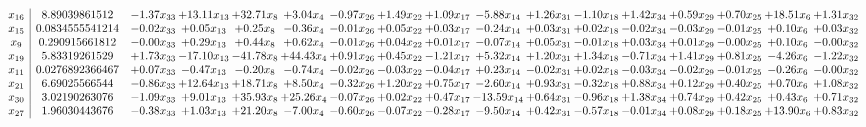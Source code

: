 \documentclass[9pt]{article}
\begin{document}
 \[\begin{array}{c| c c@{\hskip 2pt} c@{\hskip 2pt} c@{\hskip 2pt} c@{\hskip 2pt} c@{\hskip 2pt} c@{\hskip 2pt} c@{\hskip 2pt} c@{\hskip 2pt} c@{\hskip 2pt} c@{\hskip 2pt} c@{\hskip 2pt} c@{\hskip 2pt} c@{\hskip 2pt} c@{\hskip 2pt} c@{\hskip 2pt} }
 x_{16}   &  8.89039861512 & -1.37 x_{33} & + 13.11 x_{13} & + 32.71 x_{8} & +  3.04 x_{4} & -0.97 x_{26} & +  1.49 x_{22} & +  1.09 x_{17} & -5.88 x_{14} & +  1.26 x_{31} & -1.10 x_{18} & +  1.42 x_{34} & +  0.59 x_{29} & +  0.70 x_{25} & + 18.51 x_{6} & +  1.31 x_{32}\\
 x_{15}   &  0.0834555541214 & -0.02 x_{33} & +  0.05 x_{13} & +  0.25 x_{8} & -0.36 x_{4} & -0.01 x_{26} & +  0.05 x_{22} & +  0.03 x_{17} & -0.24 x_{14} & +  0.03 x_{31} & +  0.02 x_{18} & -0.02 x_{34} & -0.03 x_{29} & -0.01 x_{25} & +  0.10 x_{6} & +  0.03 x_{32}\\
 x_{9}   &  0.290915661812 & -0.00 x_{33} & +  0.29 x_{13} & +  0.44 x_{8} & +  0.62 x_{4} & -0.01 x_{26} & +  0.04 x_{22} & +  0.01 x_{17} & -0.07 x_{14} & +  0.05 x_{31} & -0.01 x_{18} & +  0.03 x_{34} & +  0.01 x_{29} & -0.00 x_{25} & +  0.10 x_{6} & -0.00 x_{32}\\
 x_{19}   &  5.83319261529 & +  1.73 x_{33} & -17.10 x_{13} & -41.78 x_{8} & + 44.43 x_{4} & +  0.91 x_{26} & +  0.45 x_{22} & -1.21 x_{17} & +  5.32 x_{14} & +  1.20 x_{31} & +  1.34 x_{18} & -0.71 x_{34} & +  1.41 x_{29} & +  0.81 x_{25} & -4.26 x_{6} & -1.22 x_{32}\\
 x_{11}   &  0.0276892366467 & +  0.07 x_{33} & -0.47 x_{13} & -0.20 x_{8} & -0.74 x_{4} & -0.02 x_{26} & -0.03 x_{22} & -0.04 x_{17} & +  0.23 x_{14} & -0.02 x_{31} & +  0.02 x_{18} & -0.03 x_{34} & -0.02 x_{29} & -0.01 x_{25} & -0.26 x_{6} & -0.00 x_{32}\\
 x_{21}   &  6.69025566544 & -0.86 x_{33} & + 12.64 x_{13} & + 18.71 x_{8} & +  8.50 x_{4} & -0.32 x_{26} & +  1.20 x_{22} & +  0.75 x_{17} & -2.60 x_{14} & +  0.93 x_{31} & -0.32 x_{18} & +  0.88 x_{34} & +  0.12 x_{29} & +  0.40 x_{25} & +  0.70 x_{6} & +  1.08 x_{32}\\
 x_{30}   &  3.02190263076 & -1.09 x_{33} & +  9.01 x_{13} & + 35.93 x_{8} & + 25.26 x_{4} & -0.07 x_{26} & +  0.02 x_{22} & +  0.47 x_{17} & -13.59 x_{14} & +  0.64 x_{31} & -0.96 x_{18} & +  1.38 x_{34} & +  0.74 x_{29} & +  0.42 x_{25} & +  0.43 x_{6} & +  0.71 x_{32}\\
 x_{27}   &  1.96030443676 & -0.38 x_{33} & +  1.03 x_{13} & + 21.20 x_{8} & -7.00 x_{4} & -0.60 x_{26} & -0.07 x_{22} & -0.28 x_{17} & -9.50 x_{14} & +  0.42 x_{31} & -0.57 x_{18} & -0.01 x_{34} & +  0.08 x_{29} & +  0.18 x_{25} & + 13.90 x_{6} & +  0.83 x_{32}\\

\end{array}\]
\end{document}
